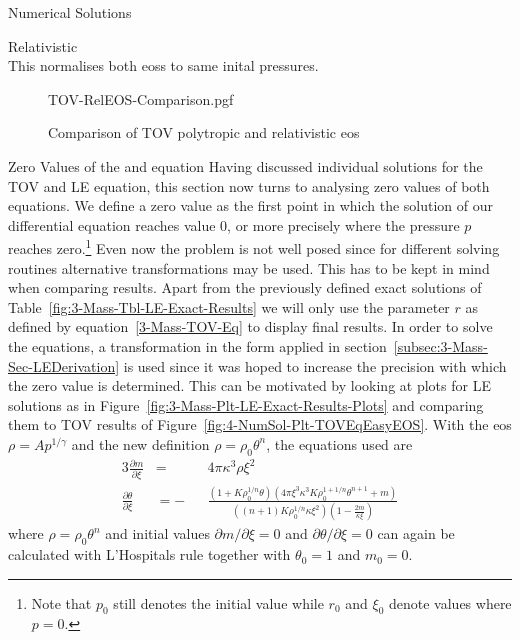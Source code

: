 \begin{section}{Numerical Solutions}
\begin{subsection}{Relativistic \texorpdfstring{}{EoS}}
\begin{equation}
\end{equation}
This normalises both \acp{eos} to same inital pressures.
\begin{figure}[H]
	\centering
	{TOV-RelEOS-Comparison.pgf}
	\caption[Comparison of TOV polytropic and relativistic EOS]{Comparison of TOV polytropic and relativistic \acs{eos}}
	\label{fig:4-NumSol-Plt-RelEOS-TOV-Comparison}
\end{figure}
\end{subsection}
%
%
\begin{subsection}{Zero Values of the \texorpdfstring{}{TOV} and \texorpdfstring{}{LE} equation}
\label{subsec:4-NumSol-Sec-TOV-Exponents}
Having discussed individual solutions for the \ac{TOV} and \ac{LE} equation, this section now turns to analysing zero values of both equations.
We define a zero value as the first point in which the solution of our differential equation reaches value $0$, or more precisely where the pressure $p$ reaches zero.\footnote{Note that $p_0$ still denotes the initial value while $r_0$ and $\xi_0$ denote values where $p=0$.}
Even now the problem is not well posed since for different solving routines alternative transformations may be used.
This has to be kept in mind when comparing results. 
Apart from the previously defined exact solutions of Table~\ref{fig:3-Mass-Tbl-LE-Exact-Results} we will only use the parameter $r$ as defined by equation~\eqref{3-Mass-TOV-Eq} to display final results.
In order to solve the equations, a transformation in the form applied in section~\ref{subsec:3-Mass-Sec-LEDerivation} is used since it was hoped to increase the precision with which the zero value is determined.
This can be motivated by looking at plots for \ac{LE} solutions as in Figure~\ref{fig:3-Mass-Plt-LE-Exact-Results-Plots} and comparing them to \ac{TOV} results of Figure~\ref{fig:4-NumSol-Plt-TOVEqEasyEOS}.
With the \ac{eos} $\rho=Ap^{1/\gamma}$ and the new definition $\rho=\rho_0\theta^n$, the equations used are 
\begin{alignat}{3}
	\frac{\partial m}{\partial\xi} &= &&4\pi\kappa^3\rho\xi^2\\
	\frac{\partial\theta}{\partial\xi} &= -&&\frac{\left(1+K\rho_0^{1/n}\theta\right)\left(4\pi\xi^3\kappa^3 K\rho_0^{1+1/n}\theta^{n+1}+ m\right)}{\left((n+1)K\rho_0^{1/n}\kappa\xi^2\right)\left(1-\frac{2 m}{\kappa\xi}\right)}
	\label{eq:4-NumSol-Equ-TOV-Exponents-Transf-TOV}
\end{alignat}
where $\rho=\rho_0\theta^n$ and initial values $\partial m/\partial\xi=0$ and $\partial\theta/\partial\xi=0$ can again be calculated with L'Hospitals rule together with $\theta_0=1$ and $ m_0=0$.

\end{subsection}
\end{section}
